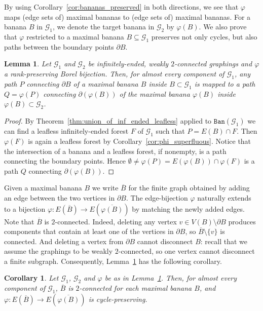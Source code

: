 \documentclass{article}
\theoremstyle{plain}
\newtheorem{lem}[thm]{Lemma}
\newtheorem{cor}[thm]{Corollary}
\theoremstyle{definition}
\newcommand{\cG}{\mathcal{G}}
\begin{document}
By using Corollary~\ref{cor:bananas_preserved} in both directions, we see that $\varphi$ maps (edge sets of) maximal bananas to (edge sets of) maximal bananas. For a banana $B$ in $\cG_1$, we denote the target banana in $\cG_2$ by $\varphi(B)$. We also prove that $\varphi$ restricted to a maximal banana $B \subseteq \cG_1$ preserves not only cycles, but also paths between the boundary points $\partial B$.

\begin{lem} \label{lem:banana_path_preserving}
    Let $\cG_1$ and $\cG_2$ be infinitely-ended, weakly $2$-connected graphings and $\varphi$ a rank-preserving Borel bijection. Then, for almost every component of $\cG_1$, any path $P$ connecting $\partial B$ of a maximal banana $B$ inside $B\subset\cG_1$ is mapped to a path $Q=\varphi(P)$ connecting $\partial(\varphi(B))$ of the maximal banana $\varphi(B)$ inside $\varphi(B)\subset\cG_2$.
\end{lem} 
\begin{proof}
    By Theorem~\ref{thm:union_of_inf_ended_leafless} applied to $\texttt{Ban}(\cG_1)$ we can find a leafless infinitely-ended forest $F$ of $\cG_1$ such that $P=E(B)\cap F$. Then $\varphi(F)$ is again a leafless forest by Corollary~\ref{cor:phi_superfluous}. Notice that the intersection of a banana and a leafless forest, if nonempty, is a path connecting the boundary points. Hence $\emptyset \neq \varphi(P) = E(\varphi(B)) \cap \varphi(F)$ is a path $Q$ connecting $\partial(\varphi(B))$.   
\end{proof}

Given a maximal banana $B$ we write $\overline{B}$ for the finite graph obtained by adding an edge between the two vertices in $\partial B$. The edge-bijection $\varphi$ naturally extends to a bijection $\varphi: E(\overline{B}) \to E(\overline{\varphi(B)})$ by matching the newly added edges. Note that $\overline{B}$ is $2$-connected. Indeed, deleting any vertex $v \in V(B)\setminus \partial B$ produces components that contain at least one of the vertices in $\partial B$, so $\overline{B} \setminus \{v\}$ is connected. And deleting a vertex from $\partial B$ cannot disconnect $B$: recall that we assume the graphings to be weakly $2$-connected, so one vertex cannot disconnect a finite subgraph. Consequently, Lemma~\ref{lem:banana_path_preserving} has the following corollary.

\begin{cor} \label{cor:extended_banana_cycle_preserving}
    Let $\cG_1$, $\cG_2$ and $\varphi$ be as in Lemma~\ref{lem:banana_path_preserving}. Then, for almost every component of $\cG_1$, $\overline{B}$ is $2$-connected for each maximal banana $B$, and $\varphi: E(\overline{B}) \to E(\overline{\varphi(B)})$ is cycle-preserving.
\end{cor}
\end{document}
